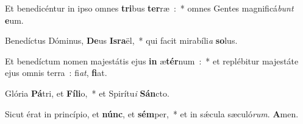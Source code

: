 \item Et benedicéntur in ipso omnes \textbf{tri}bus \textbf{ter}ræ~:~* omnes Gentes magnificá\emph{bunt} \textbf{e}um.
\item Benedíctus Dóminus, \textbf{De}us \textbf{Is}\textbf{ra}ël,~* qui facit mirabíli\emph{a} \textbf{so}lus.
\item Et benedíctum nomen majestátis ejus \textbf{in} æ\textbf{tér}num~:~* et replébitur majestáte ejus omnis terra~: fi\emph{at}, \textbf{fi}at.
\item Glória \textbf{Pá}tri, et \textbf{Fí}\textbf{li}o,~* et Spirítu\emph{i} \textbf{Sán}cto.
\item Sicut érat in princípio, et \textbf{núnc}, et \textbf{sém}per,~* et in sǽcula sæculó\emph{rum}. \textbf{A}men.